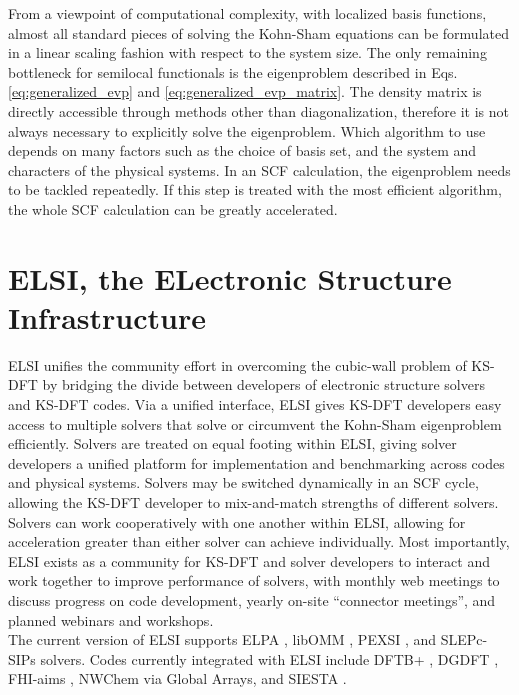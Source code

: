 \documentclass{report}
\begin{document}
From a viewpoint of computational complexity, with localized basis functions, almost all standard pieces of solving the Kohn-Sham equations can be formulated in a linear scaling fashion with respect to the system size.  The only remaining bottleneck for semilocal functionals is the eigenproblem described in Eqs. \ref{eq:generalized_evp} and \ref{eq:generalized_evp_matrix}.  The density matrix is directly accessible through methods other than diagonalization, therefore it is not always necessary to explicitly solve the eigenproblem.  Which algorithm to use depends on many factors such as the choice of basis set, and the system and characters of the physical systems.  In an SCF calculation, the eigenproblem needs to be tackled repeatedly.  If this step is treated with the most efficient algorithm, the whole SCF calculation can be greatly accelerated.\\

\section{ELSI, the ELectronic Structure Infrastructure}
\label{sec:elsi}
ELSI unifies the community effort in overcoming the cubic-wall problem of KS-DFT by bridging the divide between developers of electronic structure solvers and KS-DFT codes.  Via a unified interface, ELSI gives KS-DFT developers easy access to multiple solvers that solve or circumvent the Kohn-Sham eigenproblem efficiently.  Solvers are treated on equal footing within ELSI, giving solver developers a unified platform for implementation and benchmarking across codes and physical systems.  Solvers may be switched dynamically in an SCF cycle, allowing the KS-DFT developer to mix-and-match strengths of different solvers.  Solvers can work cooperatively with one another within ELSI, allowing for acceleration greater than either solver can achieve individually.  Most importantly, ELSI exists as a community for KS-DFT and solver developers to interact and work together to improve performance of solvers, with monthly web meetings to discuss progress on code development, yearly on-site ``connector meetings'', and planned webinars and workshops.\\

The current version of ELSI supports ELPA \cite{elpa_auckenthaler_2011,elpa_marek_2014}, libOMM \cite{libomm_corsetti_2014}, PEXSI \cite{pexsi_lin_2009,pexsi_lin_2013}, and SLEPc-SIPs \cite{slepc_hernandez_2005,sips_keceli_2016} solvers.  Codes currently integrated with ELSI include DFTB+ \cite{dftb+_aradi_2007}, DGDFT \cite{dgdft_hu_2015}, FHI-aims \cite{aims_blum_2009}, NWChem \cite{nwchem_valiev_2010} via Global Arrays, and SIESTA \cite{siesta_soler_2002}.\\
\end{document}
